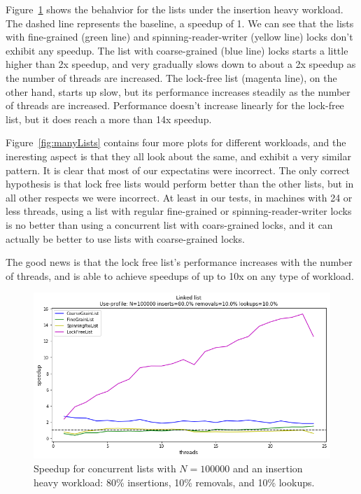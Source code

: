 \documentclass[11pt]{article}
\begin{document}
Figure~\ref{fig:listInsertHeavy} shows the behahvior for the lists under the
insertion heavy workload. The dashed line represents the baseline, a speedup of
1. We can see that the lists with fine-grained (green line) and
spinning-reader-writer (yellow line) locks don't exhibit any speedup. The list
with coarse-grained (blue line) locks starts a little higher than 2x speedup,
and very gradually slows down to about a 2x speedup as the number of threads are
increased. The lock-free list (magenta line), on the other hand, starts up slow,
but its performance increases steadily as the number of threads are increased.
Performance doesn't increase linearly for the lock-free list, but it does reach
a more than 14x speedup.

Figure~\ref{fig:manyLists} contains four more plots for different workloads, and
the ineresting aspect is that they all look about the same, and exhibit a very
similar pattern. It is clear that most of our expectatins were incorrect. The
only correct hypothesis is that lock free lists would perform better than the
other lists, but in all other respects we were incorrect. At least in our tests,
in machines with 24 or less threads, using a list with regular fine-grained or
spinning-reader-writer locks is no better than using a concurrent list with
coars-grained locks, and it can actually be better to use lists with
coarse-grained locks.

The good news is that the lock free list's performance increases with the number
of threads, and is able to achieve speedups of up to 10x on any type of workload.

\begin{figure}[h]
\centering
\includegraphics[width=1.0\linewidth]{figs/lateday/combined/lateday_combined_list_insert_80_lookup_10_removal_10}
\caption{
Speedup for concurrent lists with $N=100000$ and an insertion heavy workload:
80\% insertions, 10\% removals, and 10\% lookups.}
\label{fig:listInsertHeavy}
\end{figure}
\end{document}
